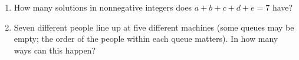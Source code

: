 \begin{enumerate}
\item[(a)] How many solutions in nonnegative integers does $a+b+c+d+e=7$ have?
\item[(b)] Seven different people line up at five different machines (some queues may be empty; the order of the people within each queue matters). In how many ways can this happen?
\end{enumerate}
